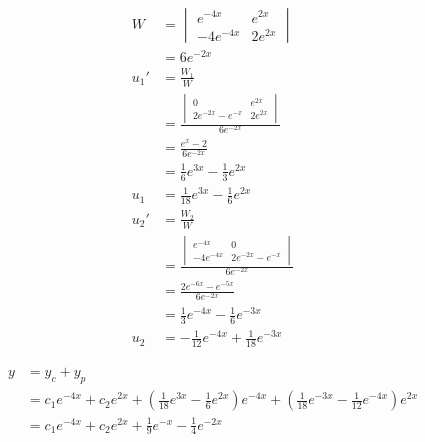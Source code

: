 \documentclass{article}
\begin{document}
\begin{align*}
  W    & = \begin{vmatrix}
             e^{-4x}   & e^{2x}  \\
             -4e^{-4x} & 2e^{2x}
           \end{vmatrix}                          \\
       & = 6e^{-2x}                                     \\
  u_1' & = \frac{W_1}{W}                                \\
       & = \frac{\begin{vmatrix}
                     0                 & e^{2x}  \\
                     2e^{-2x} - e^{-x} & 2e^{2x}
                   \end{vmatrix}}{6 e^{-2x}}            \\
       & = \frac{e^x - 2}{6e^{-2x}}                     \\
       & = \frac{1}{6} e^{3x} - \frac{1}{3} e^{2x}      \\
  u_1  & = \frac{1}{18} e^{3x} - \frac{1}{6} e^{2x}     \\
  u_2' & = \frac{W_2}{W}                                \\
       & = \frac{\begin{vmatrix}
                     e^{-4x}   & 0                 \\
                     -4e^{-4x} & 2e^{-2x} - e^{-x}
                   \end{vmatrix}}{6e^{-2x}}          \\
       & = \frac{2e^{-6x} - e^{-5x}}{6e^{-2x}}          \\
       & = \frac{1}{3} e^{-4x} - \frac{1}{6} e^{-3x}    \\
  u_2  & = -\frac{1}{12} e^{-4x} + \frac{1}{18} e^{-3x}
\end{align*}

\begin{align*}
  y & = y_c + y_p                                                                                                                                                      \\
    & = c_1 e^{-4x} + c_2 e^{2x} + \left( \frac{1}{18} e^{3x} - \frac{1}{6} e^{2x} \right) e^{-4x} + \left( \frac{1}{18} e^{-3x} - \frac{1}{12} e^{-4x} \right) e^{2x} \\
    & = c_1 e^{-4x} + c_2 e^{2x} + \frac{1}{9} e^{-x} - \frac{1}{4} e^{-2x}
\end{align*}
\end{document}
